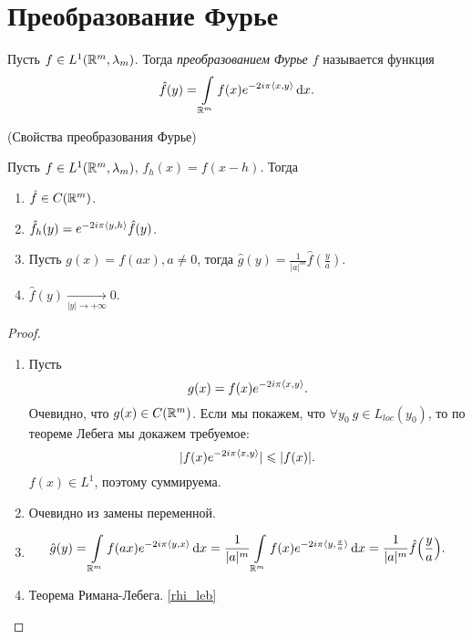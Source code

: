 \section{Преобразование Фурье}

\begin{definition}
    Пусть $f \in L^1(\mathbb{R}^m, \lambda_m)$. Тогда \textit{преобразованием
    Фурье $f$} называется функция
    \[
        \hat{f}(y) = \int\limits_{\mathbb{R}^m}{f(x) e^{-2i\pi\langle x, y \rangle} \,\mathrm{d} x}
    .\]
\end{definition}

\begin{theorem}(Свойства преобразования Фурье)

    Пусть $f \in L^1(\mathbb{R}^m, \lambda_m)$, $f_h(x) = f(x - h)$. Тогда
    \begin{enumerate}
        \item $\hat{f} \in C(\mathbb{R}^m)$.
        \item $\hat{f}_h(y) = e^{-2i\pi \langle y, h \rangle} \hat{f}(y)$.
        \item Пусть $g(x) = f(ax), a \neq 0$, тогда $\hat{g}(y) = 
            \frac{1}{|a|^m}\hat{f}(\frac{y}{a})$.
        \item $\hat{f}(y) \xrightarrow[|y| \to +\infty]{} 0$.
    \end{enumerate}
\end{theorem}
\begin{proof}
    \enewline
    \begin{enumerate}
        \item Пусть
            \[
                g(x) = f(x) e^{-2i\pi \langle x, y \rangle}
            .\]
            Очевидно, что $g(x) \in C(\mathbb{R}^m)$. Если мы покажем, что
            $\forall y_0~ g \in L_{loc}(y_0)$, то по теореме Лебега
            мы докажем требуемое:
            \[
                |f(x) e^{-2i\pi\langle x, y \rangle}| \leqslant |f(x)|
            .\]
            $f(x) \in L^1$, поэтому суммируема.
        \item Очевидно из замены переменной.
        \item \begin{align*}
                \hat{g}(y) = \intl_{\Rm}{f(ax) e^{-2i\pi\scp{y}{x}} \dd x} =
                \frac{1}{|a|^m} \intl_{\Rm}{f(x) e^{-2i\pi\scp{y}{\frac{x}{a}}} \dd x} =
                \frac{1}{|a|^m} \hat{f}\parens*{\frac{y}{a}}
            .\end{align*} 
        \item Теорема Римана-Лебега. \ref{rhi_leb} 
    \end{enumerate}
\end{proof}


